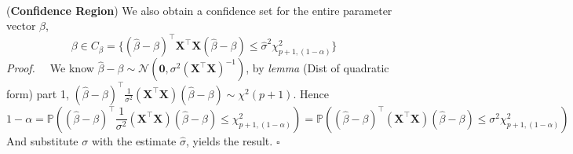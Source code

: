 \documentclass[a4paper, 11pt]{article}
\begin{document}
~\\
(\textbf{Confidence Region}) We also obtain a confidence set for the entire parameter vector $\beta$, 
$$
\beta \in C_{\beta} = \{(\hat{\beta}-\beta)^{\top}\bm{X}^{\top} \bm{X}(\hat{\beta}-\beta)\leq \hat{\sigma}^2 \chi^2_{p+1, (1-\alpha)}\}
$$ 
\textit{Proof.~~} We know $\hat{\beta}-\beta \sim \mathcal{N}(\bm{0}, \sigma^2 (\bm{X}^{\top} \bm{X})^{-1})$, by \emph{lemma} (Dist of quadratic form) part 1, 
$(\hat{\beta}-\beta)^{\top} \frac{1}{\sigma^2}(\bm{X}^{\top} \bm{X}) (\hat{\beta}-\beta) \sim \chi^2(p+1)$. Hence
$$
1- \alpha = \mathbb{P}\left((\hat{\beta}-\beta)^{\top} \frac{1}{\sigma^2}(\bm{X}^{\top} \bm{X}) (\hat{\beta}-\beta) \leq \chi^2_{p+1, (1-\alpha)} \right) = \mathbb{P}\left((\hat{\beta}-\beta)^{\top} (\bm{X}^{\top} \bm{X}) (\hat{\beta}-\beta) \leq \sigma^2\chi^2_{p+1, (1-\alpha)} \right)
$$
And substitute $\sigma$ with the estimate $\hat{\sigma}$, yields the result. $\square$
\end{document}
